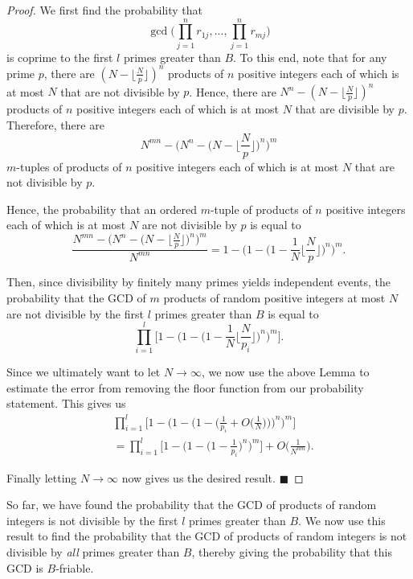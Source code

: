 \documentclass[10pt,a4paper]{article}
\theoremstyle{definition}
\theoremstyle{remark}
\begin{document}
\begin{proof}
We first find the probability that 
$$\gcd\Big(\prod_{j=1}^nr_{1j}, ..., \prod_{j=1}^n r_{mj}\Big)$$
is coprime to the first $l$ primes greater than $B$.  To this end, note that for any prime $p$, there are $(N - \lfloor\frac{N}{p}\rfloor)^n$ products of $n$ positive integers each of which is at most $N$ that are not divisible by $p$. Hence, there are $N^n - (N - \lfloor\frac{N}{p}\rfloor)^n$ products of $n$ positive integers each of which is at most $N$ that are divisible by $p$. Therefore, there are 
$$N^{mn} - \Big(N^n - \Big(N - \Big\lfloor\frac{N}{p}\Big\rfloor\Big)^n\Big)^m$$
$m$-tuples of products of $n$ positive integers each of which is at most $N$ that are not divisible by $p$.

Hence, the probability that an ordered $m$-tuple of products of $n$ positive integers each of which is at most $N$ are not divisible by $p$ is equal to
$$\frac{N^{mn} - \Big(N^n - \Big(N - \Big\lfloor\frac{N}{p}\Big\rfloor\Big)^n\Big)^m}{N^{mn}} = 1 - \Big(1 - \Big(1 - \frac{1}{N} \Big\lfloor\frac{N}{p}\Big\rfloor\Big)^n\Big)^m.$$

Then, since divisibility by finitely many primes yields independent events, the probability that the GCD of $m$ products of random positive integers at most $N$ are not divisible by the first $l$ primes greater than $B$ is equal to
$$\prod_{i=1}^l \Big[1 - \Big(1 - \Big(1 - \frac{1}{N}\Big\lfloor\frac{N}{p_i}\Big\rfloor\Big)^n\Big)^m\Big].$$

Since we ultimately want to let $N \to \infty$, we now use the above Lemma to estimate the error from removing the floor function from our probability statement. This gives us
\begin{align*}& \prod_{i=1}^l \Big[1 - \Big(1 - \Big(1 - \Big(\frac{1}{p_i} + O\Big(\frac{1}{N}\Big)\Big) \Big)^n\Big)^m\Big]\\
&= \prod_{i=1}^l \Big[1 - \Big(1 - \Big(1 - \frac{1}{p_i}  \Big)^n\Big)^m\Big] + O\Big(\frac{1}{N^{nm}}\Big).\end{align*}

\noindent Finally letting $N \to \infty$ now gives us the desired result. $\blacksquare$
\end{proof}

So far, we have found the probability that the GCD of products of random integers is not divisible by the first \(l\) primes greater than \(B\). We now use this result to find the probability that the GCD of products of random integers is not divisible by \textit{all} primes greater than $B$, thereby giving the probability that this GCD is $B$-friable.
\end{document}
